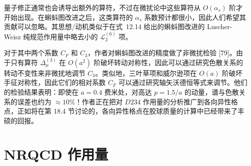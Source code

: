 量子修正通常也会诱导出额外的算符，不过在微扰论中这些算符从 $O(\alpha_s)$ 阶才开始出现。在蝌蚪图改进之后，这类算符的 $\alpha_s$ 系数预计都很小，因此人们希望其贡献可以忽略。其思想/动机类似于在式~12.14 给出的蝌蚪图改进的 Luscher-Weisz 纯规范作用量中略去小的 $\mathcal{L}_2^{(6)}$ 项。

对于其中两个系数 $C_F$ 和 $C_3$，作者对蝌蚪图改进的精度做了非微扰检验 [79]。由于只有算符 $\Delta_\mu^{(3)}$ 在 $O(a^2)$ 阶破坏转动对称性，因此可以通过研究色散关系的转动不变性来非微扰地调节 $C_3$。类似地，三叶草项和威尔逊项在 $O(a)$ 阶破坏手征对称性，因此它们的相对系数 $C_F$ 可以通过研究轴矢沃德恒等式来调节。他们的检验结果表明：即使在 $a = 0.4$ 费米处，对高达 $p = 1.5/a$ 的动量，谱与色散关系的误差也约为 $\approx 10\%$！作者正在把对 $D234$ 作用量的分析推广到各向异性格点，正如将在第 18.4 节讨论的，各向异性格点在胶球质量的计算中已经带来了丰硕的回报。

\section{NRQCD 作用量}

